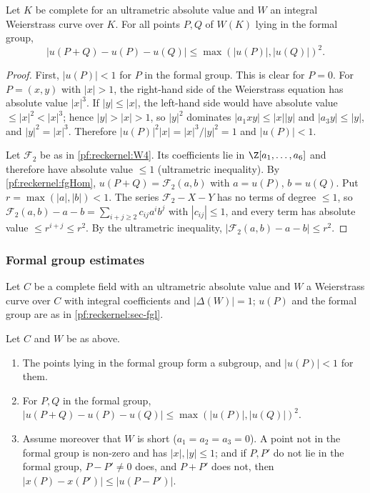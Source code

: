 \begin{theorem}\label{pf:reckernel:fgAdd}
Let $K$ be complete for an ultrametric absolute value and $W$ an integral Weierstrass curve over $K$. For all points
$P,Q$ of $W(K)$ lying in the formal group,
\[
|u(P+Q)-u(P)-u(Q)|\le\max(|u(P)|,|u(Q)|)^2 .
\]
\end{theorem}

\begin{proof}
First, $|u(P)|<1$ for $P$ in the formal group. This is clear for $P=0$. For $P=(x,y)$ with $|x|>1$, the right-hand side
of the Weierstrass equation has absolute value $|x|^3$. If $|y|\le|x|$, the left-hand side would have absolute value
$\le|x|^2<|x|^3$; hence $|y|>|x|>1$, so $|y|^2$ dominates $|a_1xy|\le|x||y|$ and $|a_3y|\le|y|$, and $|y|^2=|x|^3$.
Therefore $|u(P)|^2|x|=|x|^3/|y|^2=1$ and $|u(P)|<1$.

Let $\mathcal F_2$ be as in \ref{pf:reckernel:W4}. Its coefficients lie in $\Z[a_1,\dots,a_6]$ and therefore have
absolute value $\le1$ (ultrametric inequality). By \cref{pf:reckernel:fgHom}, $u(P+Q)=\mathcal F_2(a,b)$ with $a=u(P)$,
$b=u(Q)$. Put $r=\max(|a|,|b|)<1$. The series $\mathcal F_2-X-Y$ has no terms of degree $\le1$, so
$\mathcal F_2(a,b)-a-b=\sum_{i+j\ge2}c_{ij}a^ib^j$ with $|c_{ij}|\le1$, and every term has absolute value
$\le r^{i+j}\le r^2$. By the ultrametric inequality, $|\mathcal F_2(a,b)-a-b|\le r^2$.
\end{proof}

\subsubsection{Formal group estimates}
Let $C$ be a complete field with an ultrametric absolute value and $W$ a Weierstrass curve over $C$ with integral
coefficients and $|\Delta(W)|=1$; $u(P)$ and the formal group are as in \cref{pf:reckernel:sec-fgl}.

\begin{lemma}\label{pf:reckernel:fgFacts}
Let $C$ and $W$ be as above.
\begin{enumerate}[label=(F\arabic*)]
\item\label{pf:reckernel:F1} The points lying in the formal group form a subgroup, and $|u(P)|<1$ for them.
\item\label{pf:reckernel:F2} For $P,Q$ in the formal group, $|u(P+Q)-u(P)-u(Q)|\le\max(|u(P)|,|u(Q)|)^2$.
\item\label{pf:reckernel:F3} Assume moreover that $W$ is short ($a_1=a_2=a_3=0$). A point not in the formal group is
  non-zero and has $|x|,|y|\le1$; and if $P,P'$ do not lie in the formal group, $P-P'\ne0$ does, and $P+P'$ does
  not, then $|x(P)-x(P')|\le|u(P-P')|$.
\end{enumerate}
\end{lemma}

